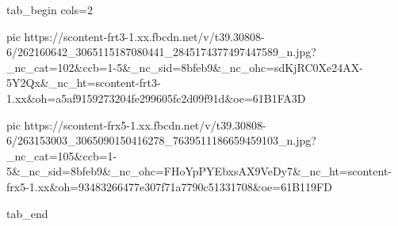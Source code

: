  
 
 
 
 

\ifcmt
  tab_begin cols=2

     pic https://scontent-frt3-1.xx.fbcdn.net/v/t39.30808-6/262160642_3065115187080441_2845174377497447589_n.jpg?_nc_cat=102&ccb=1-5&_nc_sid=8bfeb9&_nc_ohc=sdKjRC0Xe24AX-5Y2Qx&_nc_ht=scontent-frt3-1.xx&oh=a5af9159273204fe299605fc2d09f91d&oe=61B1FA3D

     pic https://scontent-frx5-1.xx.fbcdn.net/v/t39.30808-6/263153003_3065090150416278_7639511186659459103_n.jpg?_nc_cat=105&ccb=1-5&_nc_sid=8bfeb9&_nc_ohc=FHoYpPYEbxsAX9VeDy7&_nc_ht=scontent-frx5-1.xx&oh=93483266477e307f71a7790c51331708&oe=61B119FD

  tab_end
\fi
